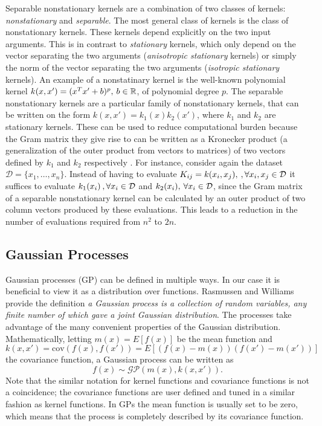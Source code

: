 \documentclass{article}
\theoremstyle{plain}
\theoremstyle{definition}
\theoremstyle{remark}
\begin{document}
Separable nonstationary kernels are a combination of two classes of kernels: \textit{nonstationary} and \textit{separable}. The most general class of kernels is the class of nonstationary kernels. These kernels depend explicitly on the two input arguments. This is in contrast to \textit{stationary} kernels, which only depend on the vector separating the two arguments (\textit{anisotropic stationary} kernels) or simply the norm of the vector separating the two arguments (\textit{isotropic stationary} kernels). An example of a nonstatinary kernel is the well-known polynomial kernel $k(x,x') = (x^Tx' + b)^p, \hspace{0.2em} b \in \mathbb{R}$, of polynomial degree $p$. The separable nonstationary kernels are a particular family of nonstationary kernels, that can be written on the form $k(x,x') = k_1(x)k_2(x')$, where $k_1$ and $k_2$ are stationary kernels. These can be used to reduce computational burden because the Gram matrix they give rise to can be written as a Kronecker product (a generalization of the outer product from vectors to matrices) of two vectors defined by $k_1$ and $k_2$ respectively \cite{genton}. For instance, consider again the dataset $\mathcal{D} = \{x_1, \hdots, x_n\}$. Instead of having to evaluate $K_{ij} = k(x_i, x_j), \hspace{0.2em}, \forall x_i,x_j \in \mathcal{D}$ it suffices to evaluate $k_1(x_i) \hspace{0.2em}, \forall x_i \in \mathcal{D}$ and $k_2(x_i), \hspace{0.2em} \forall x_i \in \mathcal{D}$, since the Gram matrix of a separable nonstationary kernel can be calculated by an outer product of two column vectors produced by these evaluations. This leads to a reduction in the number of evaluations required from $n^2$ to $2n$. 

\subsection{Gaussian Processes}
Gaussian processes (GP) can be defined in multiple ways.
In our case it is beneficial to view it as a distribution over functions.
Rasmussen and Williams \cite{rasmussen} provide the definition \textit{a Gaussian process is a collection of random variables, any finite number of which gave a joint Gaussian distribution}.
The processes take advantage of the many convenient properties of the Gaussian distribution.
Mathematically, letting $m(x) = E[f(x)]$ be the mean function and $k(x, x') = \text{cov}(f(x), f(x')) =  E[(f(x) - m(x))(f(x') - m(x'))]$ the covariance function, a Gaussian process can be written as 
\begin{equation*}
        f(x) \sim \mathcal{GP}(m(x), k(x,x')).
\end{equation*}
Note that the similar notation for kernel functions and covariance functions is not a coincidence; the covariance functions are user defined and tuned in a similar fashion as kernel functions.
In GPs the mean function is usually set to be zero, which means that the process is completely described by its covariance function.
\end{document}
